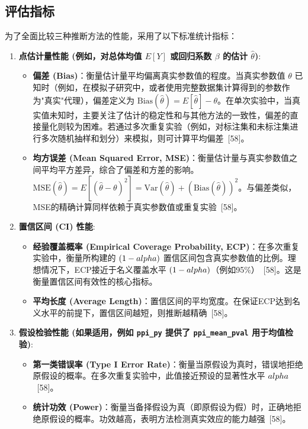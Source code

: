 \documentclass[12pt,a4paper]{article}
\begin{document}
\subsection{评估指标}
\label{sec:evaluation_metrics}
为了全面比较三种推断方法的性能，采用了以下标准统计指标：
\begin{enumerate}
    \item \textbf{点估计量性能 (例如，对总体均值 $E[Y]$ 或回归系数 $\beta$ 的估计 $\hat{\theta}$)}:
    \begin{itemize}
        \item \textbf{偏差 (Bias)}：衡量估计量平均偏离真实参数值的程度。当真实参数值 $\theta$ 已知时（例如，在模拟子研究中，或者使用完整数据集计算得到的参数作为"真实"代理），偏差定义为 $\text{Bias}(\hat{\theta})=E[\hat{\theta}]-\theta$。在单次实验中，当真实值未知时，主要关注了估计的稳定性和与其他方法的一致性，偏差的直接量化则较为困难。若通过多次重复实验（例如，对标注集和未标注集进行多次随机抽样和划分）来模拟，则可计算平均偏差~{[58]}。
        \item \textbf{均方误差 (Mean Squared Error, MSE)}：衡量估计量与真实参数值之间平均平方差异，综合了偏差和方差的影响。$\text{MSE}(\hat{\theta})=E[(\hat{\theta}-\theta)^2]=\text{Var}(\hat{\theta})+(\text{Bias}(\hat{\theta}))^2$。与偏差类似，MSE的精确计算同样依赖于真实参数值或重复实验~{[58]}。
    \end{itemize}
    \item \textbf{置信区间 (CI) 性能}:
    \begin{itemize}
        \item \textbf{经验覆盖概率 (Empirical Coverage Probability, ECP)}：在多次重复实验中，衡量所构建的 $(1-\\alpha)$ 置信区间包含真实参数值的比例。理想情况下，ECP接近于名义覆盖水平 $(1-\\alpha)$（例如95\%）~{[58]}。这是衡量置信区间有效性的核心指标。
        \item \textbf{平均长度 (Average Length)}：置信区间的平均宽度。在保证ECP达到名义水平的前提下，置信区间越短，则推断越精确~{[58]}。
    \end{itemize}
    \item \textbf{假设检验性能 (如果适用，例如 \texttt{ppi\_py} 提供了 \texttt{ppi\_mean\_pval} 用于均值检验)}:
    \begin{itemize}
        \item \textbf{第一类错误率 (Type I Error Rate)}：衡量当原假设为真时，错误地拒绝原假设的概率。在多次重复实验中，此值接近预设的显著性水平 $\\alpha$~{[58]}。
        \item \textbf{统计功效 (Power)}：衡量当备择假设为真（即原假设为假）时，正确地拒绝原假设的概率。功效越高，表明方法检测真实效应的能力越强~{[58]}。
    \end{itemize}
\end{enumerate}
\end{document}
